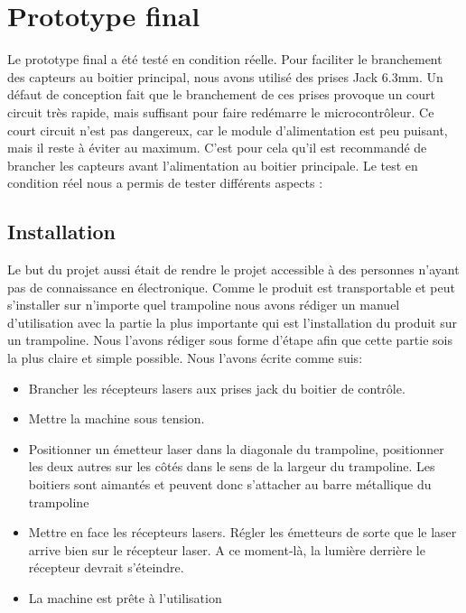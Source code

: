\section{Prototype final}
Le prototype final a été testé en condition réelle. Pour faciliter le branchement des capteurs au boitier principal, nous avons utilisé des prises Jack 6.3mm. Un défaut de conception fait que le branchement de ces prises provoque un court circuit très rapide, mais suffisant pour faire redémarre le microcontrôleur. Ce court circuit n'est pas dangereux, car le module d'alimentation est peu puisant, mais il reste à éviter au maximum. C'est pour cela qu'il est recommandé de brancher les capteurs avant l'alimentation au boitier principale. Le test en condition réel nous a permis de tester différents aspects :
\subsection{Installation}
Le but du projet aussi était de rendre le projet accessible à des personnes n'ayant pas de connaissance en électronique. Comme le produit est transportable et peut s'installer sur n'importe quel trampoline nous avons rédiger un manuel d'utilisation avec la partie la plus importante qui est l'installation du produit sur un trampoline. Nous l'avons rédiger sous forme d'étape afin que cette partie sois la plus claire et simple possible. Nous l'avons écrite comme suis:

\begin{itemize}
    \item Brancher les récepteurs lasers aux prises jack du boitier de contrôle.
    \item Mettre la machine sous tension.
    \item Positionner un émetteur laser dans la diagonale du trampoline, positionner les deux autres sur les côtés dans le sens de la largeur du trampoline. Les boitiers sont aimantés et peuvent donc s’attacher au barre métallique du trampoline
    \item Mettre en face les récepteurs lasers. Régler les émetteurs de sorte que le laser arrive bien sur le récepteur laser. A ce moment-là, la lumière derrière le récepteur devrait s’éteindre. 
    \item La machine est prête à l’utilisation
\end{itemize}


